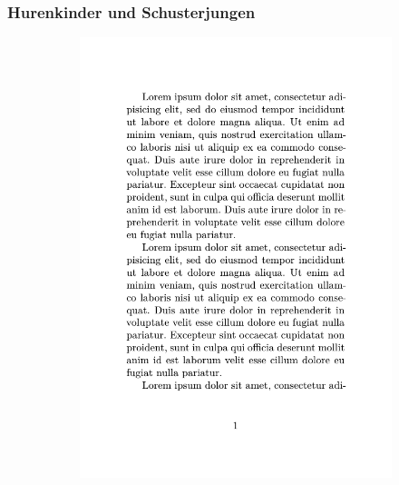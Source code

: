 \documentclass[handout]{beamer}
\begin{document}
\begin{frame}[fragile]
    \frametitle{Hurenkinder und Schusterjungen}
    \begin{figure}
        \centering%
        \begin{subfigure}{.35\textwidth}
            \includegraphics[page=1,width=\linewidth]{images/hurenkind/hurenkind.pdf}
        \end{subfigure}%
        \begin{subfigure}{.35\textwidth}

\end{subfigure}
\end{figure}
\end{frame}
\end{document}
